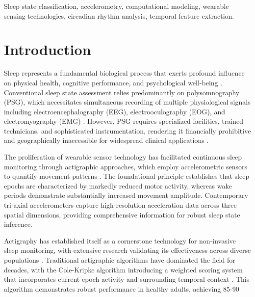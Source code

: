 \documentclass[conference]{IEEEtran}
\begin{document}
\begin{IEEEkeywords}
	Sleep state classification, accelerometry, computational modeling, wearable sensing technologies, circadian rhythm analysis, temporal feature extraction.
\end{IEEEkeywords}

\section{Introduction}

Sleep represents a fundamental biological process that exerts profound influence on physical health, cognitive performance, and psychological well-being \cite{walker2017we}. Conventional sleep state assessment relies predominantly on polysomnography (PSG), which necessitates simultaneous recording of multiple physiological signals including electroencephalography (EEG), electrooculography (EOG), and electromyography (EMG) \cite{berry2012rules}. However, PSG requires specialized facilities, trained technicians, and sophisticated instrumentation, rendering it financially prohibitive and geographically inaccessible for widespread clinical applications \cite{sadeh2011role}.

The proliferation of wearable sensor technology has facilitated continuous sleep monitoring through actigraphic approaches, which employ accelerometric sensors to quantify movement patterns \cite{ancoli2003role}. The foundational principle establishes that sleep epochs are characterized by markedly reduced motor activity, whereas wake periods demonstrate substantially increased movement amplitude. Contemporary tri-axial accelerometers capture high-resolution acceleration data across three spatial dimensions, providing comprehensive information for robust sleep state inference.

Actigraphy has established itself as a cornerstone technology for non-invasive sleep monitoring, with extensive research validating its effectiveness across diverse populations \cite{smith2018use}. Traditional actigraphic algorithms have dominated the field for decades, with the Cole-Kripke algorithm introducing a weighted scoring system that incorporates current epoch activity and surrounding temporal context \cite{cole1992automatic}. This algorithm demonstrates robust performance in healthy adults, achieving 85-90%
\end{document}
